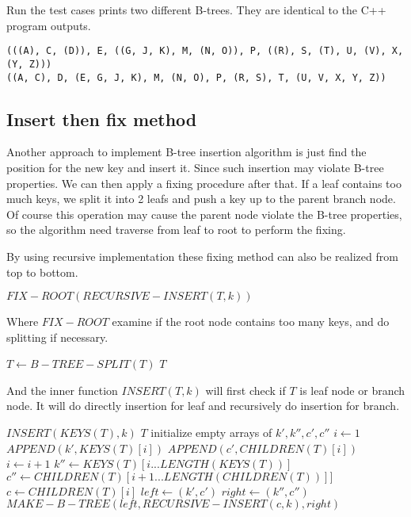 \documentclass{article}
\begin{document}
Run the test cases prints two different B-trees. They are identical 
to the C++ program outputs.

\begin{verbatim}
(((A), C, (D)), E, ((G, J, K), M, (N, O)), P, ((R), S, (T), U, (V), X, (Y, Z)))
((A, C), D, (E, G, J, K), M, (N, O), P, (R, S), T, (U, V, X, Y, Z))
\end{verbatim}

\subsection{Insert then fix method}
Another approach to implement B-tree insertion algorithm is just find
the position for the new key and insert it. Since such insertion may
violate B-tree properties. We can then apply a fixing procedure after
that. If a leaf contains too much keys, we split it into 2 leafs and
push a key up to the parent branch node. Of course this operation
may cause the parent node violate the B-tree properties, so the 
algorithm need traverse from leaf to root to perform the fixing.

By using recursive implementation these fixing method can also be
realized from top to bottom.

\begin{algorithmic}[1]
  \State \Return $FIX-ROOT(RECURSIVE-INSERT(T, k))$
\EndFunction
\end{algorithmic}

Where $FIX-ROOT$ examine if the root node contains too many keys,
and do splitting if necessary.

\begin{algorithmic}[1]
    \State $T \leftarrow B-TREE-SPLIT(T)$
  \EndIf
  \State \Return $T$
\EndFunction
\end{algorithmic}

And the inner function $INSERT(T, k)$ will first check if $T$ 
is leaf node or branch node. It will do directly insertion for leaf
and recursively do insertion for branch.

\begin{algorithmic}[1]
    \State $INSERT(KEYS(T), k)$
    \State \Return $T$
  \Else
    \State initialize empty arrays of $k', k'', c', c''$
    \State $i \leftarrow 1$
      \State $APPEND(k', KEYS(T)[i])$
      \State $APPEND(c', CHILDREN(T)[i])$
      \State $i \leftarrow i+1$
    \EndWhile
    \State $k'' \leftarrow KEYS(T)[i...LENGTH(KEYS(T))]$
    \State $c'' \leftarrow CHILDREN(T)[i+1...LENGTH(CHILDREN(T))]]$
    \State $c \leftarrow CHILDREN(T)[i]$
    \State $left \leftarrow (k', c')$
    \State $right \leftarrow (k'', c'')$
    \State \Return $MAKE-B-TREE(left, RECURSIVE-INSERT(c, k), right)$
  \EndIf
\EndFunction
\end{algorithmic}
\end{document}
